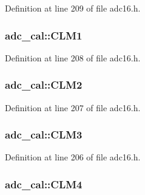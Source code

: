 Definition at line 209 of file adc16.\+h.

\subsubsection[{\texorpdfstring{C\+L\+M1}{CLM1}}]{ adc\+\_\+cal\+::\+C\+L\+M1}\hypertarget{structadc__cal_a3edc880bcdacf87e86d1464d8685779d}{}\label{structadc__cal_a3edc880bcdacf87e86d1464d8685779d}


Definition at line 208 of file adc16.\+h.

\subsubsection[{\texorpdfstring{C\+L\+M2}{CLM2}}]{ adc\+\_\+cal\+::\+C\+L\+M2}\hypertarget{structadc__cal_add50b0a700826ae47b2eef58e770a962}{}\label{structadc__cal_add50b0a700826ae47b2eef58e770a962}


Definition at line 207 of file adc16.\+h.

\subsubsection[{\texorpdfstring{C\+L\+M3}{CLM3}}]{ adc\+\_\+cal\+::\+C\+L\+M3}\hypertarget{structadc__cal_a2a78a7737f09b2158107fdcb7c71dc07}{}\label{structadc__cal_a2a78a7737f09b2158107fdcb7c71dc07}


Definition at line 206 of file adc16.\+h.

\subsubsection[{\texorpdfstring{C\+L\+M4}{CLM4}}]{ adc\+\_\+cal\+::\+C\+L\+M4}\hypertarget{structadc__cal_aa3ecafcea2cb0997c6b66f5603d9ea4b}{}\label{structadc__cal_aa3ecafcea2cb0997c6b66f5603d9ea4b}


